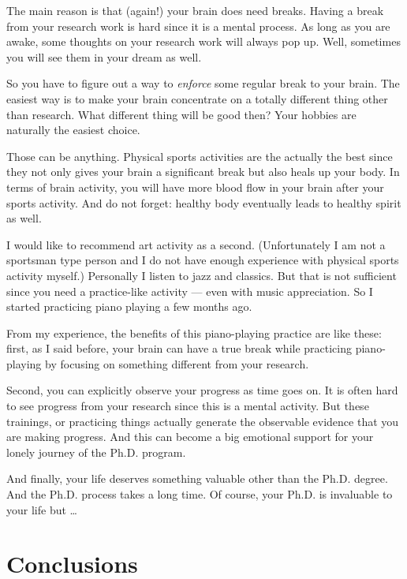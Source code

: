 \documentclass[11pt]{article}
\begin{document}
The main reason is that (again!) your brain does need breaks. Having a break
from your research work is hard since it is a mental process. As long as you
are awake, some thoughts on your research work will always pop up. Well,
sometimes you will see them in your dream as well. 

So you have to figure out a way to \emph{enforce} some regular break to your
brain. The easiest way is to make your brain concentrate on a totally
different thing other than research.  What different thing will be good then?
Your hobbies are naturally the easiest choice. 

Those can be anything. Physical sports activities are the actually the best
since they not only gives your brain a significant break but also heals up
your body. In terms of brain activity, you will have more blood flow in your
brain after your sports activity. And do not forget: healthy body eventually
leads to healthy spirit as well. 

I would like to recommend art activity as a second. (Unfortunately I am not a
sportsman type person and I do not have enough experience with physical sports
activity myself.) Personally I listen to jazz and classics. But that is not
sufficient since you need a practice-like activity --- even with music
appreciation. So I started practicing piano playing a few months ago. 

From my experience, the benefits of this piano-playing practice are like
these: first, as I said before, your brain can have a true break while
practicing piano-playing by focusing on something different from your
research.

Second, you can explicitly observe your progress as time goes on. It is often
hard to see progress from your research since this is a mental activity. But
these trainings, or practicing things actually generate the observable
evidence that you are making progress. And this can become a big emotional
support for your lonely journey of the Ph.D. program.

And finally, your life deserves something valuable other than the Ph.D.
degree. And the Ph.D. process takes a long time. Of course, your Ph.D.  is
invaluable to your life but \ldots


\section{Conclusions}
\end{document}
